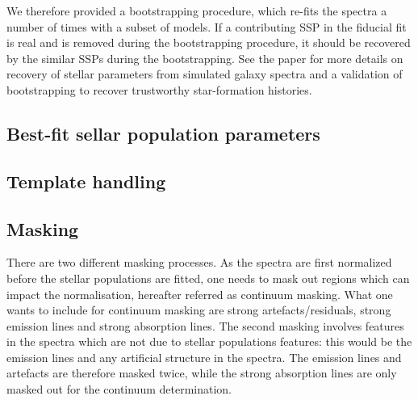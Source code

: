 \documentclass[usenatbib,usegraphicx,useAMS,onecolumn]{mn2e}
\begin{document}
We therefore provided a bootstrapping procedure, which re-fits the spectra a number of times with a subset of models.
If a contributing SSP in the fiducial fit is real and is removed during the bootstrapping procedure, it should be recovered by the similar SSPs during the bootstrapping.
See the paper for more details on recovery of stellar parameters from simulated galaxy spectra and a validation of bootstrapping to recover trustworthy star-formation histories.


\subsection{Best-fit sellar population parameters}

\subsection{Template handling}
\label{subsec:ssp_template}
\subsection{Masking}
\label{subsec:ssp_mask}
There are two different masking processes.
As the spectra are first normalized before the stellar populations are fitted, one needs to mask out regions which can impact the normalisation, hereafter referred as continuum masking.
What one wants to include for continuum masking are strong artefacts/residuals, strong emission lines and strong absorption lines.
The second masking involves features in the spectra which are not due to stellar populations features: this would be the emission lines and any artificial structure in the spectra.
The emission lines and artefacts are therefore masked twice, while the strong absorption lines are only masked out for the continuum determination.
\end{document}

